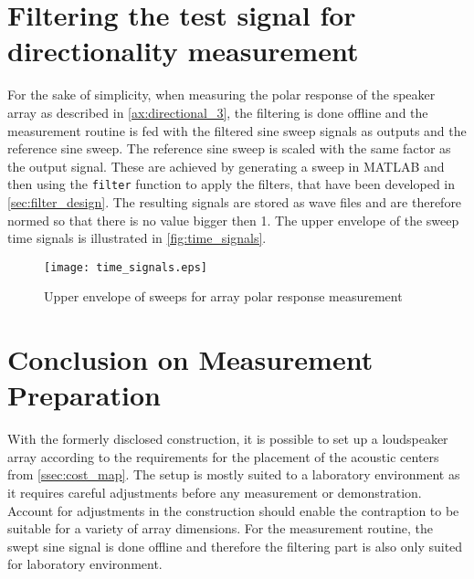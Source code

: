 \section{Filtering the test signal for directionality measurement}\label{sec:signal_filtering}
For the sake of simplicity, when measuring the polar response of the speaker array as described in \autoref{ax:directional_3}, the filtering is done offline and the measurement routine is fed with the filtered sine sweep signals as outputs and the reference sine sweep. The reference sine sweep is scaled with the same factor as the output signal. These are achieved by generating a sweep in MATLAB and then using the \texttt{filter} function to apply the filters, that have been developed in \autoref{sec:filter_design}. The resulting signals are stored as wave files and are therefore normed so that there is no value bigger then 1.
The upper envelope of the sweep time signals is illustrated in \autoref{fig:time_signals}.
\begin{figure}[H]
	\centering
	\texttt{[image: time\_signals.eps]}
	\caption{Upper envelope of sweeps for array polar response measurement}
	\label{fig:time_signals}
\end{figure}


\section{Conclusion on Measurement Preparation}
With the formerly disclosed construction, it is possible to set up a loudspeaker array according to the requirements for the placement of the acoustic centers from \autoref{ssec:cost_map}. The setup is mostly suited to a laboratory environment as it requires careful adjustments before any measurement or demonstration. Account for adjustments in the construction should enable the contraption to be suitable for a variety of array dimensions. For the measurement routine, the swept sine signal is done offline and therefore the filtering part is also only suited for laboratory environment.
